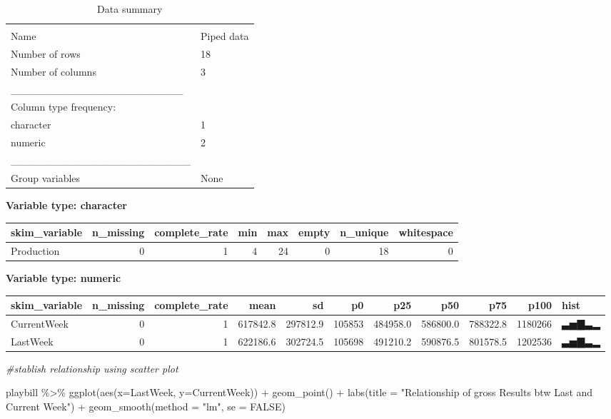 \documentclass[
]{article}
\newenvironment{Shaded}{\begin{snugshade}}{\end{snugshade}}
\newcommand{\AttributeTok}[1]{\textcolor[rgb]{0.77,0.63,0.00}{#1}}
\newcommand{\CommentTok}[1]{\textcolor[rgb]{0.56,0.35,0.01}{\textit{#1}}}
\newcommand{\ConstantTok}[1]{\textcolor[rgb]{0.00,0.00,0.00}{#1}}
\newcommand{\FunctionTok}[1]{\textcolor[rgb]{0.00,0.00,0.00}{#1}}
\newcommand{\NormalTok}[1]{#1}
\newcommand{\SpecialCharTok}[1]{\textcolor[rgb]{0.00,0.00,0.00}{#1}}
\newcommand{\StringTok}[1]{\textcolor[rgb]{0.31,0.60,0.02}{#1}}
\begin{document}
\begin{longtable}[]{@{}ll@{}}
\caption{Data summary}\tabularnewline
\toprule
& \\
\midrule
\endfirsthead
\toprule
& \\
\midrule
\endhead
Name & Piped data \\
Number of rows & 18 \\
Number of columns & 3 \\
\_\_\_\_\_\_\_\_\_\_\_\_\_\_\_\_\_\_\_\_\_\_\_ & \\
Column type frequency: & \\
character & 1 \\
numeric & 2 \\
\_\_\_\_\_\_\_\_\_\_\_\_\_\_\_\_\_\_\_\_\_\_\_\_ & \\
Group variables & None \\
\bottomrule
\end{longtable}

\textbf{Variable type: character}

\begin{longtable}[]{@{}lrrrrrrr@{}}
\toprule
skim\_variable & n\_missing & complete\_rate & min & max & empty &
n\_unique & whitespace \\
\midrule
\endhead
Production & 0 & 1 & 4 & 24 & 0 & 18 & 0 \\
\bottomrule
\end{longtable}

\textbf{Variable type: numeric}

\begin{longtable}[]{@{}lrrrrrrrrrl@{}}
\toprule
skim\_variable & n\_missing & complete\_rate & mean & sd & p0 & p25 &
p50 & p75 & p100 & hist \\
\midrule
\endhead
CurrentWeek & 0 & 1 & 617842.8 & 297812.9 & 105853 & 484958.0 & 586800.0
& 788322.8 & 1180266 & ▃▅▇▃▂ \\
LastWeek & 0 & 1 & 622186.6 & 302724.5 & 105698 & 491210.2 & 590876.5 &
801578.5 & 1202536 & ▃▅▇▃▂ \\
\bottomrule
\end{longtable}

\begin{Shaded}
\begin{Highlighting}[]
\CommentTok{\#stablish relationship using scatter plot}

\NormalTok{playbill }\SpecialCharTok{\%\textgreater{}\%} 
  \FunctionTok{ggplot}\NormalTok{(}\FunctionTok{aes}\NormalTok{(}\AttributeTok{x=}\NormalTok{LastWeek, }\AttributeTok{y=}\NormalTok{CurrentWeek)) }\SpecialCharTok{+} 
  \FunctionTok{geom\_point}\NormalTok{() }\SpecialCharTok{+}
  \FunctionTok{labs}\NormalTok{(}\AttributeTok{title =} \StringTok{"Relationship of gross Results btw Last and Current Week"}\NormalTok{) }\SpecialCharTok{+} 
  \FunctionTok{geom\_smooth}\NormalTok{(}\AttributeTok{method =} \StringTok{"lm"}\NormalTok{, }\AttributeTok{se =} \ConstantTok{FALSE}\NormalTok{)}
\end{Highlighting}
\end{Shaded}
\end{document}
